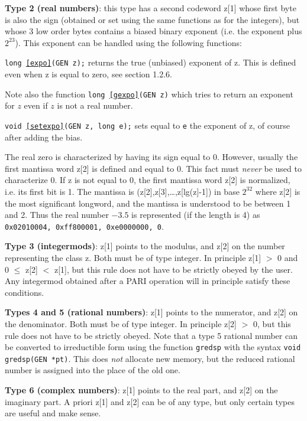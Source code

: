 {\bf Type 2 (real numbers)}: 
this type has a second codeword z[1] whose first byte
is also the sign (obtained or set using the same functions as for the integers),
but whose 3 low order bytes contains a biased binary exponent (i.e. the exponent
plus $2^{23}$). This exponent can be handled using the following functions:

{\tt long \ref{expo}(GEN z);} returns the true (unbiased) exponent of z. This is
defined even when z is equal to zero, see section 1.2.6.

Note also the function {\tt long \ref{gexpo}(GEN z)} which tries to return an exponent
for $z$ even if $z$ is not a real number.

{\tt void \ref{setexpo}(GEN z, long e);} sets equal to {\tt e} the exponent of z, of course
after adding the bias.

The real zero is characterized by having its sign equal to 0. However, usually
the first mantissa word z[2] is defined and equal to 0. This fact must {\it never\/}
be used to characterize 0. If z is not equal to 0, the first mantissa word z[2]
is normalized, i.e. its first bit is 1. The mantissa is (z[2],z[3],\dots,z[lg(z]-1])
in base $2^{32}$ where z[2] is the most significant longword, and the mantissa
is understood to be between 1 and 2. Thus the real number $-3.5$ is represented
(if the length is 4) as {\tt 0x02010004, 0xff800001, 0xe0000000, 0}.

{\bf Type 3 (integermods)}: 
z[1] points to the modulus, and z[2] on the number representing the class
z. Both must be of type integer. In principle z[1] $>$ 0 and 0 $\le$ z[2]
$<$ z[1], but this rule does not have to be strictly obeyed
by the user. Any integermod obtained after a PARI operation will in 
principle satisfy these conditions.

{\bf Types 4 and 5 (rational numbers)}: 
z[1] points to the numerator, and z[2] on the denominator. Both must be
of type integer. In principle z[2] $>$ 0, but this rule does not have to
be strictly obeyed. Note that a type 5 rational number can be converted to
irreductible form using the function {\tt gredsp} with the syntax
{\tt void gredsp(GEN *pt)}. This does {\it not\/} allocate new memory,
but the reduced rational number is assigned into the place of the old one.

{\bf Type 6 (complex numbers)}: 
z[1] points to the real part, and z[2] on the
imaginary part. A priori z[1] and z[2] can be of any type, but only certain types
are useful and make sense.

